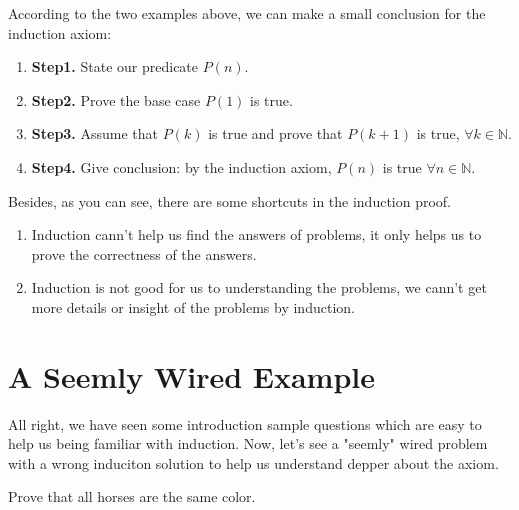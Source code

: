 \documentclass{Math_Note}
\begin{document}
According to the two examples above, we can make a small conclusion for the induction axiom:

\begin{enumerate}
    \item \textbf{Step1.} State our predicate $P(n)$.
    \item \textbf{Step2.} Prove the base case $P(1)$ is true.
    \item \textbf{Step3.} Assume that $P(k)$ is true and prove that $P(k+1)$ is true, $\forall k \in \mathbb{N}$.
    \item \textbf{Step4.} Give conclusion: by the induction axiom, $P(n)$ is true $\forall n \in \mathbb{N}$.
\end{enumerate}

Besides, as you can see, there are some shortcuts in the induction proof. 

\begin{enumerate}
    \item Induction cann't help us find the answers of problems, it only helps us to prove the correctness of the answers.
    \item Induction is not good for us to understanding the problems, we cann't get more details or insight of the problems by induction.
\end{enumerate}

\section{A Seemly Wired Example}

All right, we have seen some introduction sample questions which are easy to help us being familiar with induction. Now, let's see a "seemly" 
wired problem with a wrong induciton solution to help us understand depper about the axiom.

\begin{prb}
    Prove that all horses are the same color.
\end{prb}
\end{document}
